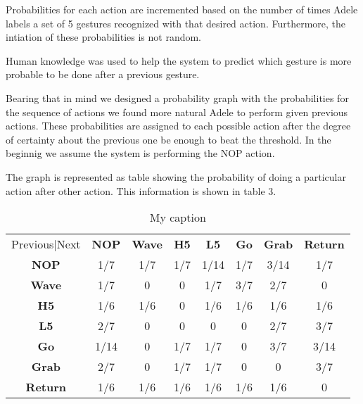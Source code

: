 Probabilities for each action are incremented based on the number of times Adele labels a set of 5 gestures recognized with that desired action. Furthermore, the intiation of these probabilities is not random. 

Human knowledge was used to help the system to predict which gesture is more probable to be done after a previous gesture. 

Bearing that in mind we designed a probability graph with the probabilities for the sequence of actions we found more natural Adele to perform given previous actions. These probabilities are assigned to each possible action after the degree of certainty about the previous one be enough to beat the threshold. In the beginnig we assume the system is performing the NOP action.

The graph is represented as table showing the probability of doing a particular action after other action. This information is shown in table 3.

\begin{table}[]
\centering
\caption{My caption}
\label{my-label}
\begin{tabular}{cccccccc}
Previous|Next                        & \textbf{NOP} & \textbf{Wave} & \textbf{H5} & \textbf{L5} & \textbf{Go} & \textbf{Grab} & \textbf{Return} \\ \cline{2-8} 
\multicolumn{1}{c|}{\textbf{NOP}}    & 1/7          & 1/7           & 1/7         & 1/14        & 1/7         & 3/14          & 1/7             \\
\multicolumn{1}{c|}{\textbf{Wave}}   & 1/7          & 0             & 0           & 1/7         & 3/7         & 2/7           & 0               \\
\multicolumn{1}{c|}{\textbf{H5}}     & 1/6          & 1/6           & 0           & 1/6         & 1/6         & 1/6           & 1/6             \\
\multicolumn{1}{c|}{\textbf{L5}}     & 2/7          & 0             & 0           & 0           & 0           & 2/7           & 3/7             \\
\multicolumn{1}{c|}{\textbf{Go}}     & 1/14         & 0             & 1/7         & 1/7         & 0           & 3/7           & 3/14            \\
\multicolumn{1}{c|}{\textbf{Grab}}   & 2/7          & 0             & 1/7         & 1/7         & 0           & 0             & 3/7             \\
\multicolumn{1}{c|}{\textbf{Return}} & 1/6          & 1/6           & 1/6         & 1/6         & 1/6         & 1/6           & 0              
\end{tabular}

\end{table}